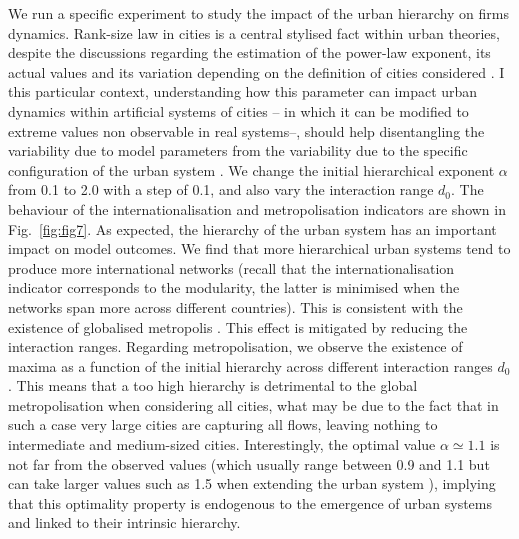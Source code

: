 \documentclass[10pt,letterpaper]{article}
\begin{document}
We run a specific experiment to study the impact of the urban hierarchy on firms dynamics. Rank-size law in cities is a central stylised fact within urban theories, despite the discussions regarding the estimation of the power-law exponent, its actual values and its variation depending on the definition of cities considered \cite{cottineau2017metazipf,corral2020truncated}. I this particular context, understanding how this parameter can impact urban dynamics within artificial systems of cities -- in which it can be modified to extreme values non observable in real systems--, should help disentangling the variability due to model parameters from the variability due to the specific configuration of the urban system \cite{raimbault2019space}. We change the initial hierarchical exponent $\alpha$ from 0.1 to 2.0 with a step of 0.1, and also vary the interaction range $d_0$. The behaviour of the internationalisation and metropolisation indicators are shown in Fig.~\ref{fig:fig7}. As expected, the hierarchy of the urban system has an important impact on model outcomes. We find that more hierarchical urban systems tend to produce more international networks (recall that the internationalisation indicator corresponds to the modularity, the latter is minimised when the networks span more across different countries). This is consistent with the existence of globalised metropolis \cite{Sassen1991}. This effect is mitigated by reducing the interaction ranges. Regarding metropolisation, we observe the existence of maxima as a function of the initial hierarchy across different interaction ranges $d_0$. This means that a too high hierarchy is detrimental to the global metropolisation when considering all cities, what may be due to the fact that in such a case very large cities are capturing all flows, leaving nothing to intermediate and medium-sized cities. Interestingly, the optimal value $\alpha \simeq 1.1$ is not far from the observed values (which usually range between 0.9 and 1.1 but can take larger values such as 1.5 when extending the urban system \cite{Raimbault_2020}), implying that this optimality property is endogenous to the emergence of urban systems and linked to their intrinsic hierarchy.
\end{document}
